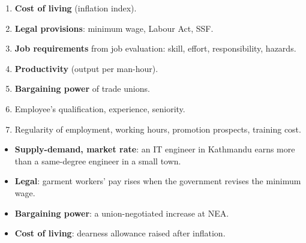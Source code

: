 {\begin{enumerate}
  \item \textbf{Cost of living} (inflation index).
  \item \textbf{Legal provisions}: minimum wage, Labour Act, SSF.
  \item \textbf{Job requirements} from job evaluation: skill, effort, responsibility,
    hazards.
  \item \textbf{Productivity} (output per man-hour).
  \item \textbf{Bargaining power} of trade unions.
  \item Employee's qualification, experience, seniority.
  \item Regularity of employment, working hours, promotion prospects, training cost.
\end{enumerate}
\begin{itemize}
  \item \textbf{Supply-demand, market rate}: an IT engineer in Kathmandu earns more than a
    same-degree engineer in a small town.
  \item \textbf{Legal}: garment workers' pay rises when the government revises the minimum
    wage.
  \item \textbf{Bargaining power}: a union-negotiated increase at NEA.
  \item \textbf{Cost of living}: dearness allowance raised after inflation.
\end{itemize}}

